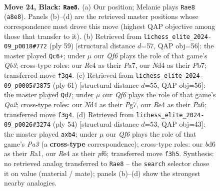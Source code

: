 \documentclass[11pt]{article}
\begin{document}
\clearpage

\begin{figure}[p]\centering
\begin{subfigure}{0.46\textwidth}\centering
\resizebox{\linewidth}{!}{%
\newchessgame
\chessboard[
  setfen={r5k1/p4p1p/Q2B2p1/8/3nr3/P4q2/5P1P/R5K1 b - - 4 24},
  showmover=false,
  pgfstyle=straightmove, color=movearrow, markmove={a8-e8}
]}
\caption{}
\end{subfigure}\hfill
\begin{subfigure}{0.46\textwidth}\centering
\resizebox{\linewidth}{!}{%
\newchessgame
\chessboard[
  setfen={4r2k/pp4pp/1q6/4n1P1/7Q/1B6/PP3PKP/4R3 b - - 1 30},
  showmover=false,
  pgfstyle=straightmove, color=movearrow, markmove={b6-c6}
]}
\caption{}
\end{subfigure}
\\[4pt]
\begin{subfigure}{0.46\textwidth}\centering
\resizebox{\linewidth}{!}{%
\newchessgame
\chessboard[
  setfen={6k1/q3r1p1/p6p/2P1p3/1P2Q3/P7/6PP/5R1K b - - 0 31},
  showmover=false,
  pgfstyle=straightmove, color=movearrow, markmove={a7-d7}
]}
\caption{}
\end{subfigure}\hfill
\begin{subfigure}{0.46\textwidth}\centering
\resizebox{\linewidth}{!}{%
\newchessgame
\chessboard[
  setfen={1r3k2/3q1p1p/4pp2/8/1p4Q1/P5P1/5P1P/R5K1 w - - 0 28},
  showmover=false,
  pgfstyle=straightmove, color=movearrow, markmove={a3-b4}
]}
\caption{}
\end{subfigure}
\caption{\textbf{Move 24, Black: \texttt{Rae8}.} (a) Our position; Melanie plays \texttt{Rae8} (\texttt{a8e8}). Panels (b)--(d) are the retrieved master positions whose correspondence most drove this move (highest QAP objective among those that transfer to it). (b) Retrieved from \texttt{lichess\_elite\_2024-09\_p0018\#772} (ply 59) [structural distance $d$=57, QAP obj=56]: the master played \texttt{Qc6+}; under $\mu$ our \emph{Qf6} plays the role of that game's \emph{Qb3}; cross-type roles: our \emph{R}e4 as their \emph{P}a7, our \emph{N}d4 as their \emph{P}b7; transferred move \texttt{f3g4}. (c) Retrieved from \texttt{lichess\_elite\_2024-09\_p0005\#3875} (ply 61) [structural distance $d$=55, QAP obj=56]: the master played \texttt{Qd7}; under $\mu$ our \emph{Qf6} plays the role of that game's \emph{Qa2}; cross-type roles: our \emph{N}d4 as their \emph{P}g7, our \emph{R}e4 as their \emph{P}a6; transferred move \texttt{f3g4}. (d) Retrieved from \texttt{lichess\_elite\_2024-09\_p0026\#3274} (ply 54) [structural distance $d$=53, QAP obj=43]: the master played \texttt{axb4}; under $\mu$ our \emph{Qf6} plays the role of that game's \emph{Pa3} (a \textbf{cross-type} correspondence); cross-type roles: our \emph{b}d6 as their \emph{R}a1, our \emph{R}e4 as their \emph{p}f6; transferred move \texttt{f3h5}. Synthesis: no retrieved analog transferred to \texttt{Rae8} -- the \texttt{search} selector chose it on value (material / mate); panels (b)--(d) show the strongest nearby analogies.}
\label{fig:thought-m47}
\end{figure}
\end{document}
